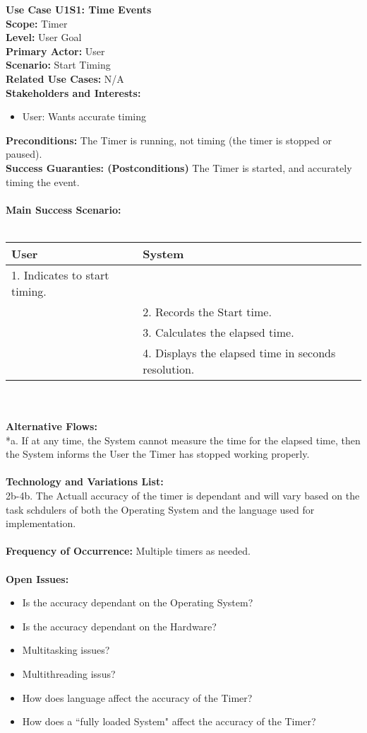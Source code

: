 \documentclass[letterpaper]{article}
\begin{document}
\noindent
\textbf{Use Case U1S1:  Time Events}\\
\textbf{Scope:  }Timer\\
\textbf{Level:  }User Goal\\
\textbf{Primary Actor:  }User\\
\textbf{Scenario:  }Start Timing\\
\textbf{Related Use Cases:  }N/A\\
\textbf{Stakeholders and Interests:}
\begin{itemize}
\item User:  Wants accurate timing
\end{itemize}
\textbf{Preconditions:  }The Timer is running, not timing (the timer
is stopped or paused).\\
\textbf{Success Guaranties:  (Postconditions)} 
The Timer is started, and accurately timing the event.\\\\
\textbf{Main Success Scenario: }\\\\
\begin{tabular}{|p{6cm}|p{6cm}|}\hline
\textbf{User} & \textbf{System}\\\hline
1.  Indicates to start timing. & \\\hline
&2.  Records the Start time.\\\hline
&3.  Calculates the elapsed time.\\\hline
&4.  Displays the elapsed time in seconds resolution.\\\hline
\end{tabular}\\\\
\textbf{Alternative Flows:  }\\
*a.  If at any time, the System cannot measure the time for the
elapsed time, then the System informs the User the Timer has
stopped working properly.\\\\
\textbf{Technology and Variations List:  }\\
2b-4b.  The Actuall accuracy of the timer is dependant and
will vary based on the task schdulers of both the Operating
System and the language used for implementation.\\\\
\textbf{Frequency of Occurrence:  }Multiple timers as needed.\\\\
\textbf{Open Issues:  }\\
\begin{itemize}
\item Is the accuracy dependant on the Operating System?
\item Is the accuracy dependant on the Hardware?
\item Multitasking issues?
\item Multithreading issus?
\item How does language affect the accuracy of the Timer?
\item How does a ``fully loaded System" affect the accuracy
of the Timer?
\end{itemize}
\end{document}
